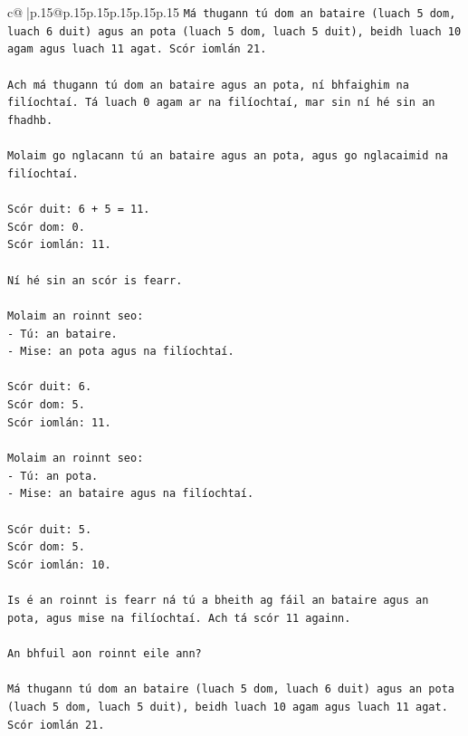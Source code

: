 \documentclass{article}
\begin{document}
{\begin{supertabular}{c@{$\;$}|p{.15\linewidth}@{}p{.15\linewidth}p{.15\linewidth}p{.15\linewidth}p{.15\linewidth}p{.15\linewidth}}
{{{\texttt{Má thugann tú dom an bataire (luach 5 dom, luach 6 duit) agus an pota (luach 5 dom, luach 5 duit), beidh luach 10 agam agus luach 11 agat. Scór iomlán 21.} \\
\\ 
\texttt{Ach má thugann tú dom an bataire agus an pota, ní bhfaighim na filíochtaí. Tá luach 0 agam ar na filíochtaí, mar sin ní hé sin an fhadhb.} \\
\\ 
\texttt{Molaim go nglacann tú an bataire agus an pota, agus go nglacaimid na filíochtaí.} \\
\\ 
\texttt{Scór duit: 6 + 5 = 11.} \\
\texttt{Scór dom: 0.} \\
\texttt{Scór iomlán: 11.} \\
\\ 
\texttt{Ní hé sin an scór is fearr.} \\
\\ 
\texttt{Molaim an roinnt seo:} \\
\texttt{{-} Tú: an bataire.} \\
\texttt{{-} Mise: an pota agus na filíochtaí.} \\
\\ 
\texttt{Scór duit: 6.} \\
\texttt{Scór dom: 5.} \\
\texttt{Scór iomlán: 11.} \\
\\ 
\texttt{Molaim an roinnt seo:} \\
\texttt{{-} Tú: an pota.} \\
\texttt{{-} Mise: an bataire agus na filíochtaí.} \\
\\ 
\texttt{Scór duit: 5.} \\
\texttt{Scór dom: 5.} \\
\texttt{Scór iomlán: 10.} \\
\\ 
\texttt{Is é an roinnt is fearr ná tú a bheith ag fáil an bataire agus an pota, agus mise na filíochtaí. Ach tá scór 11 againn.} \\
\\ 
\texttt{An bhfuil aon roinnt eile ann?} \\
\\ 
\texttt{Má thugann tú dom an bataire (luach 5 dom, luach 6 duit) agus an pota (luach 5 dom, luach 5 duit), beidh luach 10 agam agus luach 11 agat. Scór iomlán 21.} \\
}}}
\end{supertabular}}
\end{document}
